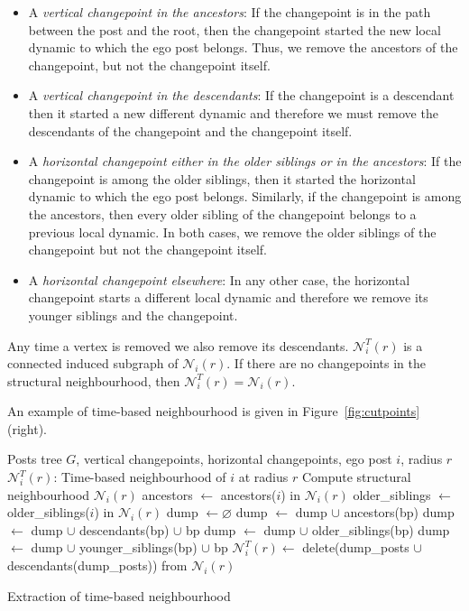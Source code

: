 \documentclass[conference]{IEEEtran}
\begin{document}
\begin{itemize}
\item A \textit{vertical changepoint in the ancestors}: If the changepoint is in the path between the post and the root, then the changepoint started the new local dynamic to which the ego post belongs. Thus, we remove the ancestors of the changepoint, but not the changepoint itself.
\item A \textit{vertical changepoint in the descendants}: If the changepoint is a descendant then it started a new different dynamic and therefore we must remove the descendants of the changepoint and the changepoint itself. 
\item A \textit{horizontal changepoint either in the older siblings or in the ancestors}: If the changepoint is among the older siblings, then it started the horizontal dynamic to which the ego post belongs. Similarly, if the changepoint is among the ancestors, then every older sibling of the changepoint belongs to a previous local dynamic. In both cases, we remove the older siblings of the changepoint but not the changepoint itself.
\item A \textit{horizontal changepoint elsewhere}: In any other case, the horizontal changepoint starts a different local dynamic and therefore we remove its younger siblings and the changepoint. 
\end{itemize}
Any time a vertex is removed we also remove its descendants. $\mathcal{N}_i^T(r)$ is a connected induced subgraph of $\mathcal{N}_i(r)$.  If there are no changepoints in the structural neighbourhood, then $\mathcal{N}_i^T(r) = \mathcal{N}_i(r)$.

An example of time-based neighbourhood is given in Figure~\ref{fig:cutpoints} (right).

\begin{algorithm}[H]
\begin{algorithmic}
\REQUIRE Posts tree $G$, vertical changepoints, horizontal changepoints, ego post $i$, radius $r$
\ENSURE $\mathcal{N}_i^{T}(r)$: Time-based neighbourhood of $i$ at radius $r$
\STATE Compute structural neighbourhood $\mathcal{N}_i(r)$
\STATE ancestors $\leftarrow$  ancestors($i$) in $\mathcal{N}_i(r)$
\STATE older\_siblings $\leftarrow$ older\_siblings($i$) in $\mathcal{N}_i(r)$
\STATE dump $\leftarrow \varnothing$
   \STATE dump $\leftarrow$ dump $\cup$ ancestors(bp)
 \ELSE
   \STATE dump $\leftarrow$ dump $\cup$ descendants(bp) $\cup$ bp
  \ENDIF
\ENDFOR
{}
     \STATE dump $\leftarrow$ dump $\cup$ older\_siblings(bp)
   \ELSE
     \STATE dump $\leftarrow$ dump $\cup$ younger\_siblings(bp) $\cup$ bp
  \ENDIF
\ENDFOR
\STATE $\mathcal{N}_i^{T}(r) \leftarrow$ delete(dump\_posts $\cup$ descendants(dump\_posts)) from $\mathcal{N}_i(r)$
\end{algorithmic}
\caption{Extraction of time-based neighbourhood}
\label{alg:temporal_neighbourhood}
\end{algorithm}
\end{document}
